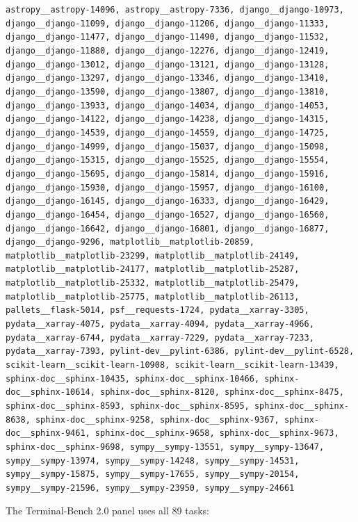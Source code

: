 \documentclass{article}
\begin{document}
{\scriptsize\texttt{astropy\_\_astropy-14096, astropy\_\_astropy-7336, django\_\_django-10973, django\_\_django-11099, django\_\_django-11206, django\_\_django-11333, django\_\_django-11477, django\_\_django-11490, django\_\_django-11532, django\_\_django-11880, django\_\_django-12276, django\_\_django-12419, django\_\_django-13012, django\_\_django-13121, django\_\_django-13128, django\_\_django-13297, django\_\_django-13346, django\_\_django-13410, django\_\_django-13590, django\_\_django-13807, django\_\_django-13810, django\_\_django-13933, django\_\_django-14034, django\_\_django-14053, django\_\_django-14122, django\_\_django-14238, django\_\_django-14315, django\_\_django-14539, django\_\_django-14559, django\_\_django-14725, django\_\_django-14999, django\_\_django-15037, django\_\_django-15098, django\_\_django-15315, django\_\_django-15525, django\_\_django-15554, django\_\_django-15695, django\_\_django-15814, django\_\_django-15916, django\_\_django-15930, django\_\_django-15957, django\_\_django-16100, django\_\_django-16145, django\_\_django-16333, django\_\_django-16429, django\_\_django-16454, django\_\_django-16527, django\_\_django-16560, django\_\_django-16642, django\_\_django-16801, django\_\_django-16877, django\_\_django-9296, matplotlib\_\_matplotlib-20859, matplotlib\_\_matplotlib-23299, matplotlib\_\_matplotlib-24149, matplotlib\_\_matplotlib-24177, matplotlib\_\_matplotlib-25287, matplotlib\_\_matplotlib-25332, matplotlib\_\_matplotlib-25479, matplotlib\_\_matplotlib-25775, matplotlib\_\_matplotlib-26113, pallets\_\_flask-5014, psf\_\_requests-1724, pydata\_\_xarray-3305, pydata\_\_xarray-4075, pydata\_\_xarray-4094, pydata\_\_xarray-4966, pydata\_\_xarray-6744, pydata\_\_xarray-7229, pydata\_\_xarray-7233, pydata\_\_xarray-7393, pylint-dev\_\_pylint-6386, pylint-dev\_\_pylint-6528, scikit-learn\_\_scikit-learn-10908, scikit-learn\_\_scikit-learn-13439, sphinx-doc\_\_sphinx-10435, sphinx-doc\_\_sphinx-10466, sphinx-doc\_\_sphinx-10614, sphinx-doc\_\_sphinx-8120, sphinx-doc\_\_sphinx-8475, sphinx-doc\_\_sphinx-8593, sphinx-doc\_\_sphinx-8595, sphinx-doc\_\_sphinx-8638, sphinx-doc\_\_sphinx-9258, sphinx-doc\_\_sphinx-9367, sphinx-doc\_\_sphinx-9461, sphinx-doc\_\_sphinx-9658, sphinx-doc\_\_sphinx-9673, sphinx-doc\_\_sphinx-9698, sympy\_\_sympy-13551, sympy\_\_sympy-13647, sympy\_\_sympy-13974, sympy\_\_sympy-14248, sympy\_\_sympy-14531, sympy\_\_sympy-15875, sympy\_\_sympy-17655, sympy\_\_sympy-20154, sympy\_\_sympy-21596, sympy\_\_sympy-23950, sympy\_\_sympy-24661}}

The Terminal-Bench 2.0 panel uses all 89 tasks:
\end{document}
